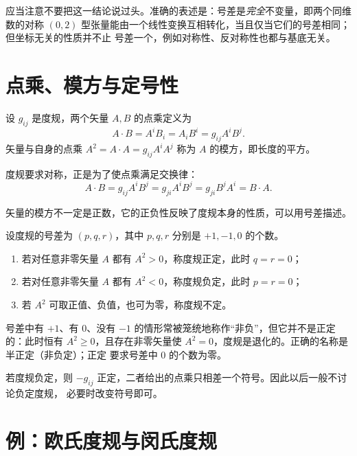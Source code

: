 \begin{remark}
应当注意不要把这一结论说过头。准确的表述是：号差是\emph{完全}不变量，即两个同维数的对称
$(0,2)$ 型张量能由一个线性变换互相转化，当且仅当它们的号差相同；但坐标无关的性质并不止
号差一个，例如对称性、反对称性也都与基底无关。
\end{remark}

\section{点乘、模方与定号性}

\begin{definition}[点乘与模方]
设 $g_{ij}$ 是度规，两个矢量 $A,B$ 的点乘定义为
\[
A\cdot B=A^iB_i=A_iB^i=g_{ij}A^iB^j .
\]
矢量与自身的点乘 $A^2=A\cdot A=g_{ij}A^iA^j$ 称为 $A$ 的模方，即长度的平方。
\end{definition}

度规要求对称，正是为了使点乘满足交换律：
\[
A\cdot B=g_{ij}A^iB^j=g_{ji}A^iB^j=g_{ji}B^jA^i=B\cdot A .
\]

矢量的模方不一定是正数，它的正负性反映了度规本身的性质，可以用号差描述。

\begin{definition}[正定、负定与不定]
设度规的号差为 $(p,q,r)$，其中 $p,q,r$ 分别是 $+1,-1,0$ 的个数。
\begin{enumerate}
\item 若对任意非零矢量 $A$ 都有 $A^2>0$，称度规正定，此时 $q=r=0$；
\item 若对任意非零矢量 $A$ 都有 $A^2<0$，称度规负定，此时 $p=r=0$；
\item 若 $A^2$ 可取正值、负值，也可为零，称度规不定。
\end{enumerate}
\end{definition}

\begin{remark}
号差中有 $+1$、有 $0$、没有 $-1$ 的情形常被笼统地称作“非负”，但它并不是正定的：此时恒有
$A^2\ge0$，且存在非零矢量使 $A^2=0$，度规是退化的。正确的名称是半正定（非负定）；正定
要求号差中 $0$ 的个数为零。
\end{remark}

若度规负定，则 $-g_{ij}$ 正定，二者给出的点乘只相差一个符号。因此以后一般不讨论负定度规，
必要时改变符号即可。

\section{例：欧氏度规与闵氏度规}

